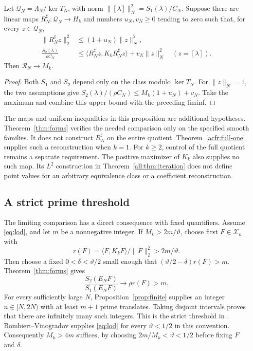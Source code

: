 \documentclass[11pt]{article}
\begin{document}
\begin{proposition}
Let\label{prop:full-criterion} $\mathcal Q_N=\Lambda_N/\ker T_N$, with norm
$\|[\lambda]\|_N^2=S_1(\lambda)/C_N$.
Suppose there are linear maps $R_N^\sharp:\mathcal Q_N\to H_k$ and
numbers $u_N,v_N\geq0$ tending to zero such that, for every $z\in\mathcal Q_N$,
\begin{align*}
 \|R_N^\sharp z\|_2^2&\leq(1+u_N)\|z\|_N^2,\\
 \frac{S_2(\lambda)}{\rho C_N}
    &\leq\langle R_N^\sharp z,K_kR_N^\sharp z\rangle
                       +v_N\|z\|_N^2\quad(z=[\lambda]).
\end{align*}
Then $\mathcal R_N\to M_k$.
\end{proposition}

\begin{proof}
Both $S_1$ and $S_2$ depend only on the class modulo $\ker T_N$.
For $\|z\|_N=1$, the two assumptions give
$S_2(\lambda)/(\rho C_N)\leq M_k(1+u_N)+v_N$.
Take the maximum and combine this upper bound with the preceding liminf.
\end{proof}

The maps and uniform inequalities in this proposition are additional
hypotheses.  Theorem~\ref{thm:forms} verifies the needed comparison only
on the specified smooth families.
It does not construct $R_N^\sharp$ on the entire quotient.
Theorem~\ref{acfr:full-one} supplies such a reconstruction when $k=1$.
For $k\geq2$, control of the full quotient remains a separate requirement.
The positive maximizer of $K_k$ also supplies no such map.
Its $L^2$ construction in Theorem~\ref{all:thm:iteration} does not define point
values for an arbitrary equivalence class or a coefficient reconstruction.

\subsection{A strict prime threshold}

The limiting comparison has a direct consequence with fixed quantifiers.
Assume \eqref{eq:lod}, and let $m$ be a nonnegative integer.
If $M_k>2m/\vartheta$, choose first $F\in\mathcal X_k$ with
\[
 r(F)=\langle F,K_kF\rangle/\|F\|_2^2>2m/\vartheta.
\]
Then choose a fixed $0<\delta<\vartheta/2$ small enough that
$(\vartheta/2-\delta)r(F)>m$.
Theorem~\ref{thm:forms} gives
\[
                 \frac{S_2(E_NF)}{S_1(E_NF)}\longrightarrow\rho r(F)>m.
\]
For every sufficiently large $N$, Proposition~\ref{prop:finite} supplies
an integer $n\in[N,2N)$ with at least $m+1$ prime translates.
Taking disjoint intervals proves that there are infinitely many such integers.
This is the strict threshold in \cite[Proposition 4.2, pp.~389--390]{Maynard}.
Bombieri--Vinogradov supplies \eqref{eq:lod} for every
$\vartheta<1/2$ in this convention.  Consequently $M_k>4m$ suffices,
by choosing $2m/M_k<\vartheta<1/2$ before fixing $F$ and $\delta$.
\end{document}

